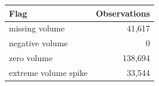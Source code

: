 \begin{tabular}{@{}lr@{}}
\toprule
Flag & Observations \\
\midrule
missing volume & 41,617 \\
negative volume & 0 \\
zero volume & 138,694 \\
extreme volume spike & 33,544 \\
\bottomrule
\end{tabular}
